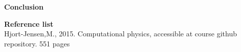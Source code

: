 \documentclass[10pt,a4paper]{article}
\begin{document}
  








\newpage
{\LARGE\bf
Conclusion
}
















\newpage
{\LARGE\bf
Reference list
}\\
Hjort-Jensen,M., 2015. Computational physics, accessible at course github repository. 551 pages
\end{document}
